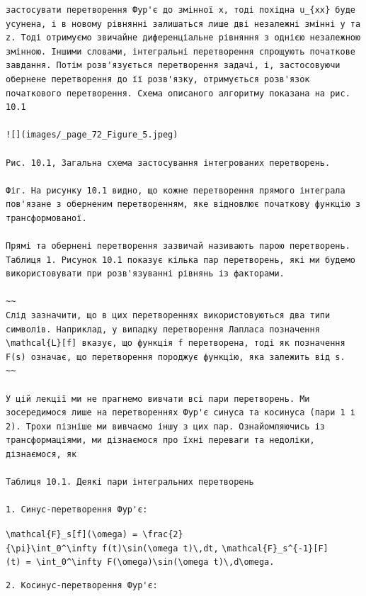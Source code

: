 \documentclass[
  ukrainian,
]{article}
\begin{document}
\begin{verbatim}
застосувати перетворення Фур'є до змінної x, тоді похідна u_{xx} буде усунена, і в новому рівнянні залишаться лише дві незалежні змінні y та z. Тоді отримуємо звичайне диференціальне рівняння з однією незалежною змінною. Іншими словами, інтегральні перетворення спрощують початкове завдання. Потім розв'язується перетворення задачі, і, застосовуючи обернене перетворення до її розв'язку, отримується розв'язок початкового перетворення. Схема описаного алгоритму показана на рис. 10.1

![](images/_page_72_Figure_5.jpeg)

Рис. 10.1, Загальна схема застосування інтегрованих перетворень.

Фіг. На рисунку 10.1 видно, що кожне перетворення прямого інтеграла пов'язане з оберненим перетворенням, яке відновлює початкову функцію з трансформованої.

Прямі та обернені перетворення зазвичай називають парою перетворень. Таблиця 1. Рисунок 10.1 показує кілька пар перетворень, які ми будемо використовувати при розв'язуванні рівнянь із факторами.

~~
Слід зазначити, що в цих перетвореннях використовуються два типи символів. Наприклад, у випадку перетворення Лапласа позначення \mathcal{L}[f] вказує, що функція f перетворена, тоді як позначення F(s) означає, що перетворення породжує функцію, яка залежить від s.
~~

У цій лекції ми не прагнемо вивчати всі пари перетворень. Ми зосередимося лише на перетвореннях Фур'є синуса та косинуса (пари 1 і 2). Трохи пізніше ми вивчаємо іншу з цих пар. Ознайомляючись із трансформаціями, ми дізнаємося про їхні переваги та недоліки, дізнаємося, як

Таблиця 10.1. Деякі пари інтегральних перетворень

1. Синус-перетворення Фур'є:
\end{verbatim}

\texttt{\textbackslash{}mathcal\{F\}\_s{[}f{]}(\textbackslash{}omega)\ =\ \textbackslash{}frac\{2\}\{\textbackslash{}pi\}\textbackslash{}int\_0\^{}\textbackslash{}infty\ f(t)\textbackslash{}sin(\textbackslash{}omega\ t)\textbackslash{},dt,}
\texttt{\textbackslash{}mathcal\{F\}\_s\^{}\{-1\}{[}F{]}(t)\ =\ \textbackslash{}int\_0\^{}\textbackslash{}infty\ F(\textbackslash{}omega)\textbackslash{}sin(\textbackslash{}omega\ t)\textbackslash{},d\textbackslash{}omega.}

\begin{verbatim}
2. Косинус-перетворення Фур'є:
\end{verbatim}
\end{document}
